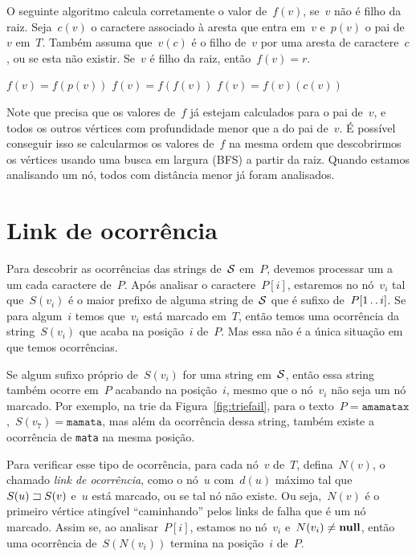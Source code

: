 O seguinte algoritmo calcula corretamente o valor de~$f(v)$, se~$v$ não é filho da raiz. Seja~$c(v)$ o caractere associado à aresta que entra em~$v$ e~$p(v)$ o pai de~$v$ em~$T$. Também assuma que~$v(c)$ é o filho de~$v$ por uma aresta de caractere~$c$, ou  se esta não existir. Se~$v$ é filho da raiz, então~$f(v) = r$.

\begin{algorithm} [ht]
\begin{algorithmic}[1]
    \State $f(v) = f(p(v))$
        \State $f(v) = f(f(v))$
    \EndWhile
        \State $f(v) = f(v)(c(v))$
    \EndIf
\end{algorithmic}
\end{algorithm}

Note que  precisa que os valores de~$f$ já estejam calculados para o pai de~$v$, e todos os outros vértices com profundidade menor que a do pai de~$v$. É possível conseguir isso se calcularmos os valores de~$f$ na mesma ordem que descobrirmos os vértices usando uma busca em largura (BFS) a partir da raiz. Quando estamos analisando um nó, todos com distância menor já foram analisados.

\section{Link de ocorrência}
\label{sec:linkoc}

Para descobrir as ocorrências das strings de~$\mathcal{S}$ em~$P$, devemos processar um a um cada caractere de~$P$. Após analisar o caractere~$P[i]$, estaremos no nó~$v_i$ tal que~$S(v_i)$ é o maior prefixo de alguma string de~$\mathcal{S}$ que é sufixo de~$P[1\,.\,.\, i]$. Se para algum~$i$ temos que~$v_i$ está marcado em~$T$, então temos uma ocorrência da string~$S(v_i)$ que acaba na posição~$i$ de~$P$. Mas essa não é a única situação em que temos ocorrências.

Se algum sufixo próprio de~$S(v_i)$ for uma string em~$\mathcal{S}$, então essa string também ocorre em~$P$ acabando na posição~$i$, mesmo que o nó~$v_i$ não seja um nó marcado. Por exemplo, na trie da Figura~\ref{fig:triefail}, para o texto~$P = \texttt{amamatax}$,~$S(v_7) = \texttt{mamata}$, mas além da ocorrência dessa string, também existe a ocorrência de \texttt{mata} na mesma posição.

Para verificar esse tipo de ocorrência, para cada nó~$v$ de~$T$, defina~$N(v)$, o chamado \emph{link de ocorrência}, como o nó~$u$ com~$d(u)$ máximo tal que~$S(u) \sqsupset S(v)$ e~$u$ está marcado, ou  se tal nó não existe. Ou seja,~$N(v)$ é o primeiro vértice atingível ``caminhando'' pelos links de falha que é um nó marcado. Assim se, ao analisar~$P[i]$, estamos no nó~$v_i$ e~$N(v_i) \neq \text{\textbf{null}}$, então uma ocorrência de~$S(N(v_i))$ termina na posição~$i$ de~$P$.

